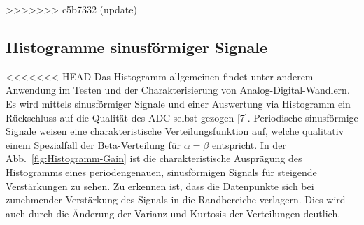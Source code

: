 >>>>>>> c5b7332 (update)


\subsection{Histogramme sinusförmiger Signale }
<<<<<<< HEAD
Das Histogramm allgemeinen findet unter anderem Anwendung im Testen und der Charakterisierung von Analog-Digital-Wandlern. Es wird mittels sinusförmiger Signale und einer Auswertung via Histogramm ein Rückschluss auf die Qualität des ADC selbst gezogen [7]. Periodische sinusförmige Signale weisen eine charakteristische Verteilungsfunktion auf, welche qualitativ einem Spezialfall der Beta-Verteilung für $\alpha = \beta$ entspricht. In der Abb.~\ref{fig:Histogramm-Gain} ist die charakteristische Ausprägung des Histogramms eines periodengenauen, sinusförmigen Signals für steigende Verstärkungen zu sehen. Zu erkennen ist, dass die Datenpunkte sich bei zunehmender Verstärkung des Signals in die Randbereiche verlagern. Dies wird auch durch die Änderung der Varianz und Kurtosis der Verteilungen deutlich.
